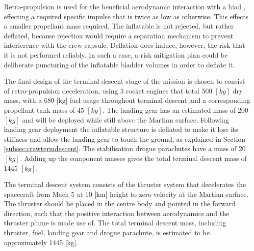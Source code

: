 Retro-propulsion is used for the beneficial aerodynamic interaction with a \gls{hiad} \cite{Korzun2009}, effecting a required specific impulse that is twice as low as otherwise. This effects a smaller propellant mass required. The inflatable is not rejected, but rather deflated, because rejection would require a separation mechanism to prevent interference with the crew capsule. Deflation does induce, however, the risk that it is not performed reliably. In such a case, a risk mitigation plan could be deliberate puncturing of the inflatable bladder volumes in order to deflate it.

The final design of the terminal descent stage of the mission is chosen to consist of retro-propulsion deceleration, using 3 rocket engines that total 500 $[kg]$ dry mass, with a 680 [kg] fuel usage throughout terminal descent and a corresponding propellant tank mass of 45 $[kg]$. The landing gear has an estimated mass of 200 $[kg]$ and will be deployed while still above the Martian surface. Following landing gear deployment the inflatable structure is deflated to make it lose its stiffness and allow the landing gear to touch the ground, as explained in Section \ref{subsec:crewtermdescent}. The stabilisation drogue parachutes have a mass of 20 $[kg]$. Adding up the component masses gives the total terminal descent mass of 1445 $[kg]$.

The terminal descent system consists of the thruster system that decelerates the spacecraft from Mach 5 at 10 [km] height to zero velocity at the Martian surface. The thruster should be placed in the centre body and pointed in the forward direction, such that the positive interaction between aerodynamics and the thruster plume is made use of. The total terminal descent mass, including thruster, fuel, landing gear and drogue parachute, is estimated to be approximately 1445 [kg].